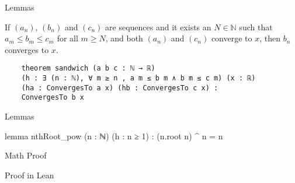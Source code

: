 \documentclass{beamer}
\begin{document}
\begin{frame}[fragile]{Lemmas}
    \begin{lemma}
        If $(a_n)$, $(b_n)$ and $(c_n)$ are sequences and it exists an $N \in \mathbb{N}$ such that $a_m \leq b_m \leq c_m$ for all $m \geq N$, and both $(a_n)$ and $(c_n)$ converge to $x$, then $b_n$ converges to $x$.
    \end{lemma}

    \begin{lemma}
    \begin{lstlisting}
    theorem sandwich (a b c : ℕ → ℝ) 
    (h : ∃ (n : ℕ), ∀ m ≥ n , a m ≤ b m ∧ b m ≤ c m) (x : ℝ)
    (ha : ConvergesTo a x) (hb : ConvergesTo c x) :
    ConvergesTo b x
    \end{lstlisting}
    \end{lemma}
\end{frame}

\begin{frame}[fragile]{Lemmas}
    \begin{lemma}
        
    \end{lemma}
    \begin{lemma}
    \begin{leancode}
    lemma nthRoot_pow (n : ℕ) (h : n ≥ 1) : (n.root n) ^ n = n
    \end{leancode}
    \end{lemma}
\end{frame}

\begin{frame}{Math Proof}
\end{frame}

\begin{frame}{Proof in Lean}
\end{frame}
\end{document}
